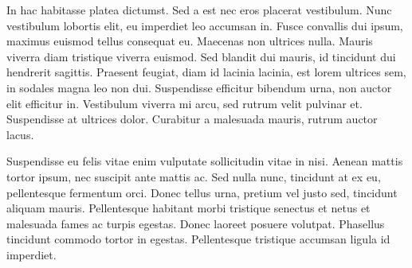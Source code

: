 \documentclass[../main.tex]{subfiles}
\begin{document}
In hac habitasse platea dictumst. Sed a est nec eros placerat vestibulum. Nunc vestibulum lobortis elit, eu imperdiet leo accumsan in. Fusce convallis dui ipsum, maximus euismod tellus consequat eu. Maecenas non ultrices nulla. Mauris viverra diam tristique viverra euismod. Sed blandit dui mauris, id tincidunt dui hendrerit sagittis. Praesent feugiat, diam id lacinia lacinia, est lorem ultrices sem, in sodales magna leo non dui. Suspendisse efficitur bibendum urna, non auctor elit efficitur in. Vestibulum viverra mi arcu, sed rutrum velit pulvinar et. Suspendisse at ultrices dolor. Curabitur a malesuada mauris, rutrum auctor lacus.

Suspendisse eu felis vitae enim vulputate sollicitudin vitae in nisi. Aenean mattis tortor ipsum, nec suscipit ante mattis ac. Sed nulla nunc, tincidunt at ex eu, pellentesque fermentum orci. Donec tellus urna, pretium vel justo sed, tincidunt aliquam mauris. Pellentesque habitant morbi tristique senectus et netus et malesuada fames ac turpis egestas. Donec laoreet posuere volutpat. Phasellus tincidunt commodo tortor in egestas. Pellentesque tristique accumsan ligula id imperdiet. 
\end{document}
